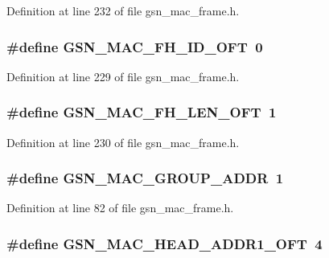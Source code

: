 Definition at line 232 of file gsn\_\-mac\_\-frame.h.

\hypertarget{a00523_ada2cf57e63cf13150fd4d2a732fc9962}{
\subsubsection[{GSN\_\-MAC\_\-FH\_\-ID\_\-OFT}]{\setlength{\rightskip}{0pt plus 5cm}\#define GSN\_\-MAC\_\-FH\_\-ID\_\-OFT~0}}
\label{a00523_ada2cf57e63cf13150fd4d2a732fc9962}


Definition at line 229 of file gsn\_\-mac\_\-frame.h.

\hypertarget{a00523_a01c1644294a4c35e6f04d438a1f3a0bf}{
\subsubsection[{GSN\_\-MAC\_\-FH\_\-LEN\_\-OFT}]{\setlength{\rightskip}{0pt plus 5cm}\#define GSN\_\-MAC\_\-FH\_\-LEN\_\-OFT~1}}
\label{a00523_a01c1644294a4c35e6f04d438a1f3a0bf}


Definition at line 230 of file gsn\_\-mac\_\-frame.h.

\hypertarget{a00523_a3db408b3669662589a6d7181d721512a}{
\subsubsection[{GSN\_\-MAC\_\-GROUP\_\-ADDR}]{\setlength{\rightskip}{0pt plus 5cm}\#define GSN\_\-MAC\_\-GROUP\_\-ADDR~1}}
\label{a00523_a3db408b3669662589a6d7181d721512a}


Definition at line 82 of file gsn\_\-mac\_\-frame.h.

\hypertarget{a00523_a988a265a567b415343692df942c3ab9a}{
\subsubsection[{GSN\_\-MAC\_\-HEAD\_\-ADDR1\_\-OFT}]{\setlength{\rightskip}{0pt plus 5cm}\#define GSN\_\-MAC\_\-HEAD\_\-ADDR1\_\-OFT~4}}
\label{a00523_a988a265a567b415343692df942c3ab9a}


